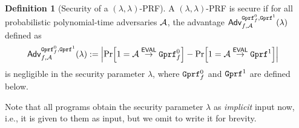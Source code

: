 \documentclass[a4paper,table,dvipsnames]{article}
\theoremstyle{definition}
\newtheorem{definition}{Definition}[section]
\newcommand{\M}[1]{\ensuremath{\text{\texttt{#1}}}}
\renewcommand{\O}[1]{\ensuremath{\mathsf{#1}}}
\begin{document}
\begin{definition}[Security of a $(\lambda,\lambda)$-PRF]
A $(\lambda,\lambda)$-PRF is secure if for all probabilistic polynomial-time adversaries $\mathcal{A}$,  the advantage $\mathsf{Adv}^{\M{Gprf}_f^0,\M{Gprf}^1}_{f,\adv}(\lambda)$ defined as
\begin{align*}
&\mathsf{Adv}^{\M{Gprf}_f^0,\M{Gprf}^1}_{f,\adv}(\lambda):=
\abs{\prob{1=\adv\stackrel{\O{EVAL}}{\rightarrow}\M{Gprf}^0_f}-\prob{1=\adv\stackrel{\O{EVAL}}{\rightarrow}\M{Gprf}^1}}
\end{align*}
is negligible in the security parameter $\lambda$, where $\M{Gprf}^0_f$ and $\M{Gprf}^1$ are defined below.
\end{definition}
Note that all programs obtain the security parameter $\lambda$
as \emph{implicit} input now, i.e., it is given to them as input, but we omit to write it for brevity.
\end{document}
